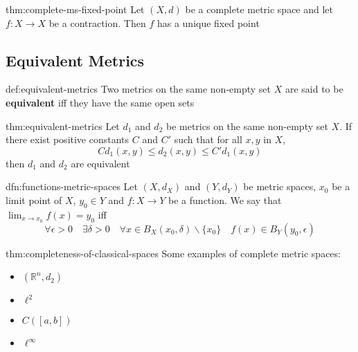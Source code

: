 \documentclass[landscape, 8pt]{extarticle}
\begin{document}
\begin{multicols}{3}
\begin{thm}{thm:complete-ms-fixed-point}{}
    Let $(X, d)$ be a complete metric space and let $f : X \to X$ be a contraction. Then $f$ has a unique fixed point
\end{thm}

\subsection{Equivalent Metrics}
\begin{dfn}{def:equivalent-metrics}{}
    Two metrics on the same non-empty set $X$ are said to be \textbf{equivalent} iff they have the same open sets
\end{dfn}

\begin{thm}{thm:equivalent-metrics}{}
    Let $d_{1}$ and $d_{2}$ be metrics on the same non-empty set $X$. If there exist positive constants $C$ and $C'$ such that for all $x, y$ in $X$,
    \[Cd_{1}(x, y) \le d_{2}(x, y) \le C'd_{1}(x, y)\]
    then $d_{1}$ and $d_{2}$ are equivalent
\end{thm}

\begin{dfn}{dfn:functions-metric-spaces}{}
    Let $(X, d_{X})$ and $(Y, d_{Y})$ be metric spaces, $x_{0}$ be a limit point of $X$, $y_{0}\in Y$ and $f : X \to Y$ be a function. We say that $\lim_{x\to x_{0}} f(x) = y_{0}$ iff
    \[\forall \epsilon > 0 \quad \exists \delta > 0 \quad \forall x\in B_{X}(x_{0}, \delta) \backslash \{x_{0}\} \quad f(x)\in B_{Y}(y_{0}, \epsilon)\]
\end{dfn}

\begin{thm}{thm:completeness-of-classical-spaces}{}
    \vspace{-5pt}
    Some examples of complete metric spaces:
    \vspace{-12pt}
    \begin{multicols}{4}
    \begin{itemize}
        \item $(\mathbb{R}^{n}, d_{2})$
        \item $\ell^{2}$
        \item $C([a, b])$
        \item $\ell^{\infty}$
    \end{itemize}
    \end{multicols}
    \vspace{-5pt}
    \longrule{0.08ex}
    \vspace{-5pt}


\end{thm}
\end{multicols}
\end{document}
